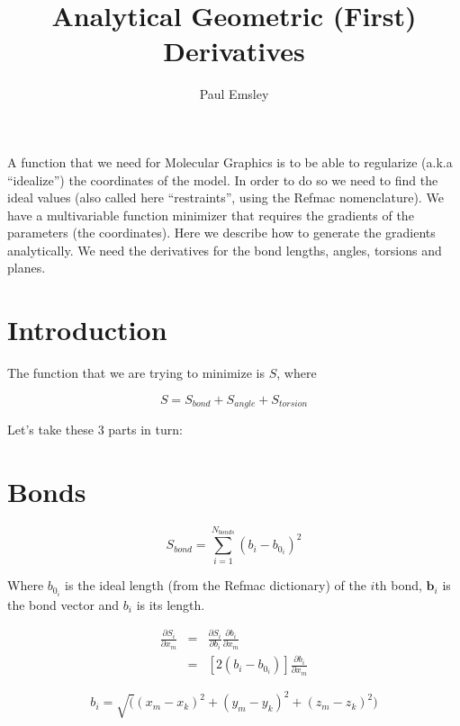 \documentclass[a4paper,twocolumn,9pt]{article}
\title{Analytical Geometric (First) Derivatives}
\author{Paul Emsley}
\begin{document}
\maketitle

A function that we need for Molecular Graphics is to be able to
regularize (a.k.a ``idealize'') the coordinates of the model.  In
order to do so we need to find the ideal values (also called here
``restraints'', using the Refmac nomenclature).  We have a
multivariable function minimizer that requires the gradients of the
parameters (the coordinates).  Here we describe how to generate the
gradients analytically.  We need the derivatives for the bond lengths,
angles, torsions and planes.

\section{Introduction}

The function that we are trying to minimize is $S$, where

\begin{displaymath}
  S = S_{bond} + S_{angle} + S_{torsion}
\end{displaymath}

Let's take these 3 parts in turn:


\section{Bonds}

\begin{displaymath}
  S_{bond} = \sum_{i=1}^{N_{bonds}} {(b_i - b_{0_i})^2}
\end{displaymath}

Where $b_{0_i}$ is the ideal length (from the Refmac dictionary) of
the $i$th bond, $\mathbf{b}_i$ is the bond vector and $b_i$ is its length.

\begin{eqnarray*}
  \label{eq:1}
  \frac{\partial S_i}{\partial x_m} & = & \frac{\partial S_i}{\partial b_i} 
  \frac{\partial b_i}{\partial x_m} \\
   & = & [2(b_i - b_{0_i})]   \frac{\partial b_i}{\partial x_m}
\end{eqnarray*}

\begin{displaymath}
  b_i = \sqrt((x_m-x_k)^2 + (y_m-y_k)^2 + (z_m-z_k)^2)
\end{displaymath}
\end{document}
